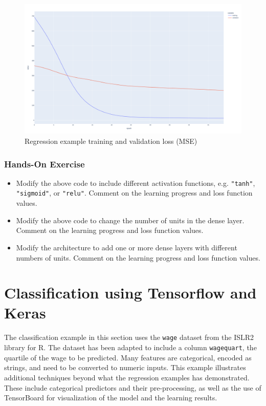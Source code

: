 \begin{figure}
\centering
\includegraphics[width=.9\textwidth]{regression_training.png}
\caption{Regression example training and validation loss (MSE)}
\label{fig:regressiontraining}
\end{figure}

\begin{tcolorbox}[colback=code]
\subsubsection*{Hands-On Exercise} 
\begin{itemize}
  \item Modify the above code to include different activation functions, e.g. \texttt{"tanh"}, \texttt{"sigmoid"}, or \texttt{"relu"}. Comment on the learning progress and loss function values.
  \item Modify the above code to change the number of units in the dense layer. Comment on the learning progress and loss function values.
  \item Modify the architecture to add one or more dense layers with different numbers of units. Comment on the learning progress and loss function values.
\end{itemize}
\end{tcolorbox}

\section{Classification using Tensorflow and Keras}

The classification example in this section uses the \texttt{wage} dataset from the ISLR2 library for R. The dataset has been adapted to include a column \texttt{wagequart}, the quartile of the wage to be predicted. Many features are categorical, encoded as strings, and need to be converted to numeric inputs. This example illustrates additional techniques beyond what the regression examples has demonstrated. These include categorical predictors and their pre-processing, as well as the use of TensorBoard for visualization of the model and the learning results.

